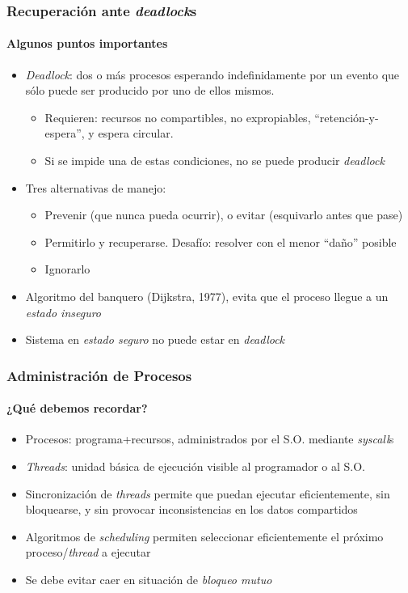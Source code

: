 \documentclass[letter]{beamer}
\begin{document}
\begin{frame}
  \frametitle{Recuperación ante {\em deadlock}s}
  \framesubtitle{Algunos puntos importantes}

  \begin{itemize}
    \item {\em Deadlock}: dos o más procesos esperando indefinidamente por un evento
          que sólo puede ser producido por uno de ellos mismos.
          \begin{itemize}
            \item Requieren: recursos no compartibles, no expropiables, ``retención-y-espera'',
                  y espera circular.
            \item Si se impide una de estas condiciones, no se puede producir {\em deadlock}
          \end{itemize}
    \item Tres alternativas de manejo:
      \begin{itemize}
        \item Prevenir (que nunca pueda ocurrir), o evitar (esquivarlo antes que pase)
        \item Permitirlo y recuperarse. Desafío: resolver con el menor ``daño'' posible
        \item Ignorarlo
      \end{itemize}
    \item Algoritmo del banquero (Dijkstra, 1977), evita que el proceso llegue a un {\em estado inseguro}
    \item Sistema en {\em estado seguro} no puede estar en {\em deadlock}
  \end{itemize}

\end{frame}

\begin{frame}
  \frametitle{Administración de Procesos}
  \framesubtitle{¿Qué debemos recordar?}
 
  \begin{itemize}
    \item Procesos: programa+recursos, administrados por el S.O. mediante {\em syscall}s
    \item {\em Threads}: unidad básica de ejecución visible al programador o al S.O.
    \item Sincronización de {\em threads} permite que puedan ejecutar eficientemente, sin bloquearse,
          y sin provocar inconsistencias en los datos compartidos
    \item Algoritmos de {\em scheduling} permiten seleccionar eficientemente el próximo proceso/{\em thread} a ejecutar
    \item Se debe evitar caer en situación de {\em bloqueo mutuo}
  \end{itemize}


\end{frame}
\end{document}

